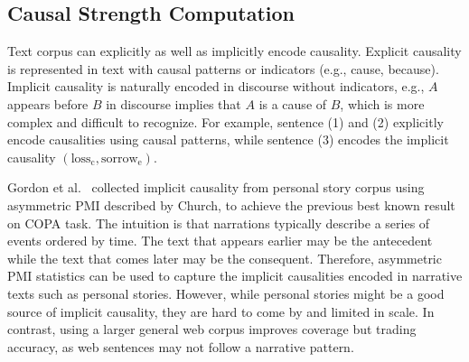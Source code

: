 \subsection{Causal Strength Computation}
\label{sec:causalstrength}

Text corpus can explicitly as well as implicitly encode causality.
Explicit causality is represented in text
with causal patterns or indicators (e.g., cause, because).
Implicit causality is naturally encoded in discourse without indicators, e.g.,
$A$ appears before $B$ in discourse implies that $A$ is a cause of $B$,
which is more complex and difficult to recognize.
For example,
sentence (1) and (2) explicitly encode causalities using causal patterns,
while sentence (3) encodes the implicit causality
$(\text{loss}_{\text{c}}, \text{sorrow}_{\text{e}})$.

Gordon et al.~ collected implicit causality
from personal story corpus using asymmetric PMI described by Church,
to achieve the previous best known result on COPA task.
The intuition is that narrations typically describe a series of events
ordered by time. The text that appears earlier may be the antecedent
while the text that comes later may be the consequent.
Therefore, asymmetric PMI statistics can be used to capture
the implicit causalities encoded in narrative texts such as personal stories.
However, while personal stories might be a good source of implicit causality,
they are hard to come by and limited in scale.
In contrast, using a larger general web corpus improves coverage but
trading accuracy, as web sentences may not follow a narrative pattern.

